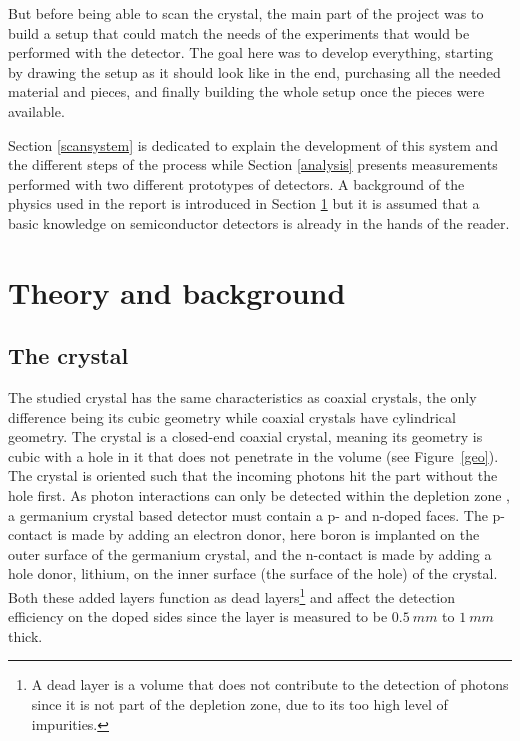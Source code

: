 \documentclass[11pt,a4paper]{article}
\begin{document}
But before being able to scan the crystal, the main part of the project was to build a setup that could match the needs of the experiments that would be performed with the detector. The goal here was to develop everything, starting by drawing the setup as it should look like in the end, purchasing all the needed material and pieces, and finally building the whole setup once the pieces were available. 

Section \ref{scansystem} is dedicated to explain the development of this system and the different steps of the process while Section \ref{analysis} presents measurements performed with two different prototypes of detectors. A background of the physics used in the report is introduced in Section \ref{theory} but it is assumed that a basic knowledge on semiconductor detectors is already in the hands of the reader.

\newpage

\section{Theory and background} \label{theory}

\subsection{The crystal}

The studied crystal has the same characteristics as coaxial crystals, the only difference being its cubic geometry while coaxial crystals have cylindrical geometry. The crystal is a closed-end coaxial crystal, meaning its geometry is cubic with a hole in it that does not penetrate in the volume (see Figure~\ref{geo}). The crystal is oriented such that the incoming photons hit the part without the hole first. As photon interactions can only be detected within the depletion zone \cite{phot}, a germanium crystal based detector must contain a p- and n-doped faces. The p-contact is made by adding an electron donor, here boron is implanted on the outer surface of the germanium crystal, and the n-contact is made by adding a hole donor, lithium, on the inner surface (the surface of the hole) of the crystal. Both these added layers function as dead layers\footnote{A dead layer is a volume that does not contribute to the detection of photons since it is not part of the depletion zone, due to its too high level of impurities.} and affect the detection efficiency on the doped sides since the layer is measured to be $0.5~mm$ to $1~mm$ thick.
\end{document}
